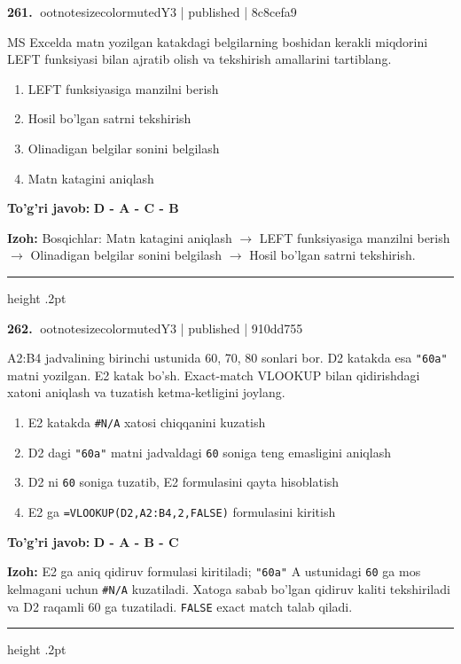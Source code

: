 \documentclass[10pt,a4paper]{article}
\begin{document}
\textbf{\color{ink}261.} {ootnotesizecolor{muted}Y3 | published | 8c8cefa9}
\par
MS Excelda matn yozilgan katakdagi belgilarning boshidan kerakli miqdorini LEFT funksiyasi bilan ajratib olish va tekshirish amallarini tartiblang.
\begin{enumerate}[label=\Alph*),leftmargin=9mm]
\item LEFT funksiyasiga manzilni berish
\item Hosil bo'lgan satrni tekshirish
\item Olinadigan belgilar sonini belgilash
\item Matn katagini aniqlash
\end{enumerate}
\begin{tcolorbox}[enhanced,breakable,colback=teal!4,colframe=teal!55!black,boxrule=0.45pt,arc=1.2mm,left=2.8mm,right=2.8mm,top=2mm,bottom=2mm]
\textbf{\color{teal}To'g'ri javob:} \textbf{D - A - C - B}
\par\smallskip
\textbf{Izoh:} Bosqichlar: Matn katagini aniqlash \ensuremath{\rightarrow} LEFT funksiyasiga manzilni berish \ensuremath{\rightarrow} Olinadigan belgilar sonini belgilash \ensuremath{\rightarrow} Hosil bo'lgan satrni tekshirish.
\end{tcolorbox}
\vspace{2mm}\hrule height .2pt\vspace{2mm}

\textbf{\color{ink}262.} {ootnotesizecolor{muted}Y3 | published | 910dd755}
\par
A2:B4 jadvalining birinchi ustunida 60, 70, 80 sonlari bor. D2 katakda esa \texttt{"60a"} matni yozilgan. E2 katak bo'sh. Exact-match VLOOKUP bilan qidirishdagi xatoni aniqlash va tuzatish ketma-ketligini joylang.
\begin{enumerate}[label=\Alph*),leftmargin=9mm]
\item E2 katakda \texttt{\#N/A} xatosi chiqqanini kuzatish
\item D2 dagi \texttt{"60a"} matni jadvaldagi \texttt{60} soniga teng emasligini aniqlash
\item D2 ni \texttt{60} soniga tuzatib, E2 formulasini qayta hisoblatish
\item E2 ga \texttt{=VLOOKUP(D2,A2:B4,2,FALSE)} formulasini kiritish
\end{enumerate}
\begin{tcolorbox}[enhanced,breakable,colback=teal!4,colframe=teal!55!black,boxrule=0.45pt,arc=1.2mm,left=2.8mm,right=2.8mm,top=2mm,bottom=2mm]
\textbf{\color{teal}To'g'ri javob:} \textbf{D - A - B - C}
\par\smallskip
\textbf{Izoh:} E2 ga aniq qidiruv formulasi kiritiladi; \texttt{"60a"} A ustunidagi \texttt{60} ga mos kelmagani uchun \texttt{\#N/A} kuzatiladi. Xatoga sabab bo'lgan qidiruv kaliti tekshiriladi va D2 raqamli 60 ga tuzatiladi. \texttt{FALSE} exact match talab qiladi.
\end{tcolorbox}
\vspace{2mm}\hrule height .2pt\vspace{2mm}
\end{document}
